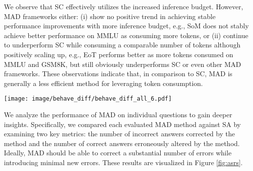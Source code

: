 We observe that 
SC effectively utilizes the increased inference budget. However, MAD frameworks either: (i) show no positive trend in achieving stable performance improvements with more inference budget, e.g., SoM does not stably achieve better performance on MMLU as consuming more tokens, or (ii) continue to underperform SC while consuming a comparable number of tokens although positively scaling up, e.g., EoT performs better as more tokens consumed on MMLU and GSM8K, but still obviously underperforms SC or even other MAD frameworks. These observations indicate that, in comparison to SC, MAD is generally a less efficient method for leveraging token consumption.

\begin{figure*}[tb!]
     \centering
     \texttt{[image: image/behave\_diff/behave\_diff\_all\_6.pdf]}
        \caption{Comparing the behavior of inference strategies to direct prompting a single-agent. The green bar represents the number of corrected answers, and the Fred bar represents the number of answers erroneously reversed compared to standard single-agent prompting.}
        \label{fig:asrs}
\end{figure*} 

 We analyze the performance of MAD on individual questions to gain deeper insights. Specifically, we compared each evaluated MAD method against SA by examining two key metrics: the number of incorrect answers corrected by the method and the number of correct answers erroneously altered by the method. 
Ideally, MAD should be able to correct a substantial number of errors while introducing minimal new errors.
These results are visualized in Figure \ref{fig:asrs}.


